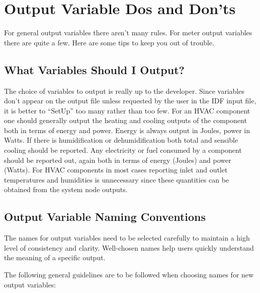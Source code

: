 \section{Output Variable Dos and Don'ts}\label{output-variable-dos-and-donts}

For general output variables there aren't many rules. For meter output variables there are quite a few. Here are some tips to keep you out of trouble.

\subsection{What Variables Should I Output?}\label{what-variables-should-i-output}

The choice of variables to output is really up to the developer. Since variables don't appear on the output file unless requested by the user in the IDF input file, it is better to ``SetUp'' too many rather than too few. For an HVAC component one should generally output the heating and cooling outputs of the component both in terms of energy and power. Energy is always output in Joules, power in Watts. If there is humidification or dehumidification both total and sensible cooling should be reported. Any electricity or fuel consumed by a component should be reported out, again both in terms of energy (Joules) and power (Watts). For HVAC components in most cases reporting inlet and outlet temperatures and humidities is unnecessary since these quantities can be obtained from the system node outputs.

\subsection{Output Variable Naming Conventions}\label{output-variable-naming-conventions}

The names for output variables need to be selected carefully to maintain a high level of consistency and clarity. Well-chosen names help users quickly understand the meaning of a specific output.

The following general guidelines are to be followed when choosing names for new output variables:

